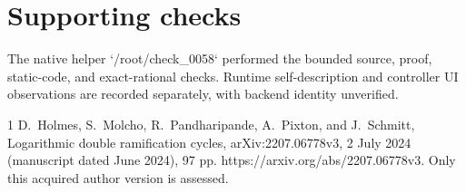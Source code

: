 \documentclass[10pt]{article}
\begin{document}
\section*{Supporting checks}
The native helper `/root/check\_0058` performed the bounded source, proof, static-code, and exact-rational checks. Runtime self-description and controller UI observations are recorded separately, with backend identity unverified.\par
1 D. Holmes, S. Molcho, R. Pandharipande, A. Pixton, and J. Schmitt, Logarithmic double ramification cycles, arXiv:2207.06778v3, 2 July 2024 (manuscript dated June 2024), 97 pp. https://arxiv.org/abs/2207.06778v3. Only this acquired author version is assessed.\par
\end{document}
